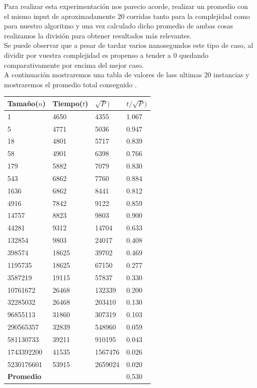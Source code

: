 Para realizar esta experimentaci\'on nos parecio acorde, realizar un promedio con el mismo input de aproximadamente 20 corridas
tanto para la complejidad como para nuestro algoritmo y una vez calculado dicho promedio de ambas cosas realizamos la divisi\'on para
obtener resultados m\'as relevantes.\\ 

Se puede observar que a pesar de tardar varios nanosegundos este tipo de caso, al dividir por vuestra complejidad
es propenso a tender a 0 quedando comparativamente por encima del mejor caso.\\

A continuaci\'on mostraremos una tabla de valores de lass ultimas 20 instancias y
mostraremos el promedio total conseguido .\\


\begin{table}[H]

    \begin{tabular}{ | l | l |l |l |}
    \hline
	Tamaño($n$) & Tiempo($t$) & \textbf{$\sqrt{P})$} & \textbf{$t/\sqrt{P})$}  \\ \hline
1 & 4650	 & 4355 &	1.067 \\ \hline
5 &	4771	 & 5036	& 0.947\\ \hline
18 &	4801	 & 5717	& 0.839\\ \hline
58 &	4901	 & 6398	& 0.766\\ \hline
179 &	5882	 & 7079	& 0.830\\ \hline
543	& 6862	&7760 &	0.884\\ \hline
1636	 & 6862 &	8441 &	0.812\\ \hline
4916	 & 7842	 & 9122 & 	 0.859\\ \hline
14757 &	8823	 & 9803 &	0.900\\ \hline
44281 &	9312	 & 14704 &	0.633\\ \hline
132854 &	 9803	 & 24017 &	0.408\\ \hline
398574 &	 18625 & 	39702 &	0.469\\ \hline
1195735 &	18625 &	67150 &	0.277\\ \hline
3587219	& 19115	& 57837&	 0.330\\ \hline
10761672 	& 26468 &	132339 & 	0.200\\ \hline
32285032	 &26468& 	 203410	& 0.130\\ \hline
96855113 & 	31860 &	307319 & 	0.103\\ \hline
290565357 &	32839 &	548960 &	 0.059\\ \hline
581130733 & 	39211 &	910195 &	 0.043\\ \hline
1743392200 &	41535 &	1567476 &	0.026\\ \hline
5230176601 &	53915 &	2659024	&0.020\\ \hline

    \textbf{Promedio} & & & 0,530 \\ \hline
    \end{tabular}
\end{table}

